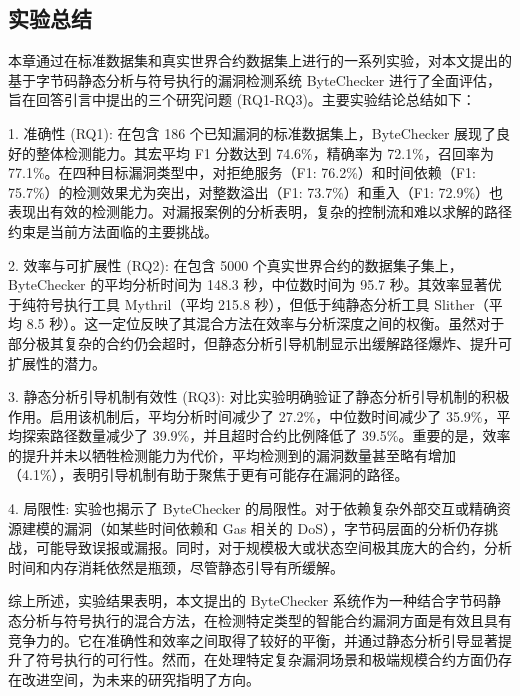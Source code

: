 \documentclass[print, master, vlined, timesmath]{DissertUESTC}
\begin{document}
\subsection{实验总结}

本章通过在标准数据集和真实世界合约数据集上进行的一系列实验，对本文提出的基于字节码静态分析与符号执行的漏洞检测系统 ByteChecker 进行了全面评估，旨在回答引言中提出的三个研究问题 (RQ1-RQ3)。主要实验结论总结如下：

1.  准确性 (RQ1): 在包含 186 个已知漏洞的标准数据集上，ByteChecker 展现了良好的整体检测能力。其宏平均 F1 分数达到 74.6\%，精确率为 72.1\%，召回率为 77.1\%。在四种目标漏洞类型中，对拒绝服务（F1: 76.2\%）和时间依赖（F1: 75.7\%）的检测效果尤为突出，对整数溢出（F1: 73.7\%）和重入（F1: 72.9\%）也表现出有效的检测能力。对漏报案例的分析表明，复杂的控制流和难以求解的路径约束是当前方法面临的主要挑战。

2.  效率与可扩展性 (RQ2): 在包含 5000 个真实世界合约的数据集子集上，ByteChecker 的平均分析时间为 148.3 秒，中位数时间为 95.7 秒。其效率显著优于纯符号执行工具 Mythril（平均 215.8 秒），但低于纯静态分析工具 Slither（平均 8.5 秒）。这一定位反映了其混合方法在效率与分析深度之间的权衡。虽然对于部分极其复杂的合约仍会超时，但静态分析引导机制显示出缓解路径爆炸、提升可扩展性的潜力。

3.  静态分析引导机制有效性 (RQ3): 对比实验明确验证了静态分析引导机制的积极作用。启用该机制后，平均分析时间减少了 27.2\%，中位数时间减少了 35.9\%，平均探索路径数量减少了 39.9\%，并且超时合约比例降低了 39.5\%。重要的是，效率的提升并未以牺牲检测能力为代价，平均检测到的漏洞数量甚至略有增加（4.1\%），表明引导机制有助于聚焦于更有可能存在漏洞的路径。

4.  局限性: 实验也揭示了 ByteChecker 的局限性。对于依赖复杂外部交互或精确资源建模的漏洞（如某些时间依赖和 Gas 相关的 DoS），字节码层面的分析仍存挑战，可能导致误报或漏报。同时，对于规模极大或状态空间极其庞大的合约，分析时间和内存消耗依然是瓶颈，尽管静态引导有所缓解。

综上所述，实验结果表明，本文提出的 ByteChecker 系统作为一种结合字节码静态分析与符号执行的混合方法，在检测特定类型的智能合约漏洞方面是有效且具有竞争力的。它在准确性和效率之间取得了较好的平衡，并通过静态分析引导显著提升了符号执行的可行性。然而，在处理特定复杂漏洞场景和极端规模合约方面仍存在改进空间，为未来的研究指明了方向。



\end{document}
